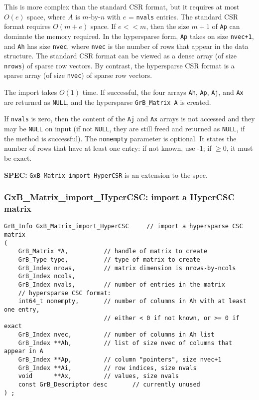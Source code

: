 \documentclass[12pt]{article}
\begin{document}
\vspace{-0.05in}
This is more complex than the standard CSR format, but it requires at most
$O(e)$ space, where $A$ is $m$-by-$n$ with $e$ = \verb'nvals' entries.  The
standard CSR format requires $O(m+e)$ space.  If $e << m$, then the size $m+1$
of \verb'Ap' can dominate the memory required.  In the hypersparse form,
\verb'Ap' takes on size \verb'nvec+1', and \verb'Ah' has size \verb'nvec',
where \verb'nvec' is the number of rows that appear in the data structure.
The standard CSR format can be viewed as a dense array (of size \verb'nrows')
of sparse row vectors.   By contrast, the hypersparse CSR format is a sparse
array (of size \verb'nvec') of sparse row vectors.

The import takes $O(1)$ time.  If successful, the four arrays \verb'Ah',
\verb'Ap', \verb'Aj', and \verb'Ax' are returned as \verb'NULL', and the
hypersparse \verb'GrB_Matrix A' is created.

If \verb'nvals' is zero, then the content of the \verb'Aj' and \verb'Ax' arrays
is not accessed and they may be \verb'NULL' on input (if not \verb'NULL', they
are still freed and returned as \verb'NULL', if the method is successful).
The \verb'nonempty' parameter is optional.  It states the number of rows
that have at least one entry: if not known, use -1;
if $\ge 0$, it must be exact.

\begin{spec}
{\bf SPEC:} \verb'GxB_Matrix_import_HyperCSR' is an extension to the spec.
\end{spec}

\newpage
\subsubsection{{\sf GxB\_Matrix\_import\_HyperCSC:} import a HyperCSC matrix}
\label{matrix_import_hypercsc}

\begin{mdframed}[userdefinedwidth=6in]
{\footnotesize
\begin{verbatim}
GrB_Info GxB_Matrix_import_HyperCSC     // import a hypersparse CSC matrix
(
    GrB_Matrix *A,          // handle of matrix to create
    GrB_Type type,          // type of matrix to create
    GrB_Index nrows,        // matrix dimension is nrows-by-ncols
    GrB_Index ncols,
    GrB_Index nvals,        // number of entries in the matrix
    // hypersparse CSC format:
    int64_t nonempty,       // number of columns in Ah with at least one entry,
                            // either < 0 if not known, or >= 0 if exact
    GrB_Index nvec,         // number of columns in Ah list
    GrB_Index **Ah,         // list of size nvec of columns that appear in A
    GrB_Index **Ap,         // column "pointers", size nvec+1
    GrB_Index **Ai,         // row indices, size nvals
    void      **Ax,         // values, size nvals
    const GrB_Descriptor desc       // currently unused
) ;
\end{verbatim}
} \end{mdframed}
\end{document}
